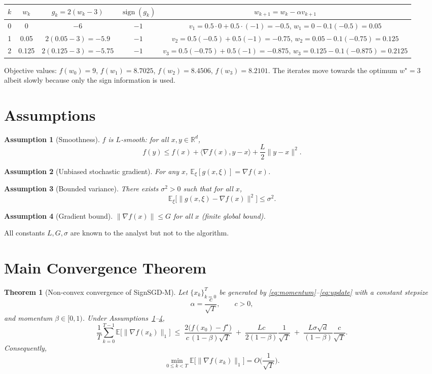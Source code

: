 \documentclass[11pt]{article}
\newtheorem{theorem}{Theorem}
\newtheorem{assumption}{Assumption}
\begin{document}
\begin{center}
\begin{tabular}{c|c|c|c|c}
$k$ & $w_k$ & $g_k=2(w_k-3)$ & $\operatorname{sign}(g_k)$ & $w_{k+1}=w_k-\alpha v_{k+1}$ \\ \hline
0 & 0 & $-6$ & $-1$ & $v_1=0.5\cdot0+0.5\cdot(-1)=-0.5$, $w_1=0-0.1(-0.5)=0.05$\\
1 & 0.05 & $2(0.05-3)=-5.9$ & $-1$ & $v_2=0.5(-0.5)+0.5(-1)=-0.75$, $w_2=0.05-0.1(-0.75)=0.125$\\
2 & 0.125 & $2(0.125-3)=-5.75$ & $-1$ & $v_3=0.5(-0.75)+0.5(-1)=-0.875$, $w_3=0.125-0.1(-0.875)=0.2125$
\end{tabular}
\end{center}
Objective values: $f(w_0)=9$, $f(w_1)=8.7025$, $f(w_2)=8.4506$, $f(w_3)=8.2101$.  
The iterates move towards the optimum $w^\star=3$ albeit slowly because only the sign information is used.

\newpage

\section*{Assumptions}
\begin{assumption}[Smoothness]\label{asm:smooth}
$f$ is $L$‑smooth: for all $x,y\in\mathbb{R}^d$,
\[
f(y)\le f(x)+\langle\nabla f(x),y-x\rangle+\frac{L}{2}\|y-x\|^2 .
\]
\end{assumption}
\begin{assumption}[Unbiased stochastic gradient]\label{asm:unbiased}
For any $x$, $\mathbb{E}_{\xi}[g(x,\xi)] = \nabla f(x)$.
\end{assumption}
\begin{assumption}[Bounded variance]\label{asm:var}
There exists $\sigma^2>0$ such that for all $x$,
\[
\mathbb{E}_{\xi}\big[\|g(x,\xi)-\nabla f(x)\|^2\big]\le\sigma^2 .
\]
\end{assumption}
\begin{assumption}[Gradient bound]\label{asm:gradbound}
$\|\nabla f(x)\|\le G$ for all $x$ (finite global bound).
\end{assumption}
All constants $L,G,\sigma$ are known to the analyst but not to the algorithm.

\section*{Main Convergence Theorem}
\begin{theorem}[Non‑convex convergence of SignSGD‑M]\label{thm:main}
Let $\{x_k\}_{k=0}^T$ be generated by \eqref{eq:momentum}–\eqref{eq:update} with a constant stepsize
\[
\alpha = \frac{c}{\sqrt{T}},\qquad c>0,
\]
and momentum $\beta\in[0,1)$. Under Assumptions~\ref{asm:smooth}–\ref{asm:gradbound},
\[
\frac{1}{T}\sum_{k=0}^{T-1}\mathbb{E}\big[\|\nabla f(x_k)\|_1\big]
\;\le\;
\frac{2\big(f(x_0)-f^\star\big)}{c\,(1-\beta)\sqrt{T}}
\;+\;
\frac{L c}{2(1-\beta)}\frac{1}{\sqrt{T}}
\;+\;
\frac{L\sigma\sqrt{d}}{(1-\beta)}\frac{c}{\sqrt{T}} .
\]
Consequently,
\[
\min_{0\le k<T}\mathbb{E}\big[\|\nabla f(x_k)\|_1\big]
= O\!\Big(\frac{1}{\sqrt{T}}\Big).
\]
\end{theorem}
\end{document}
